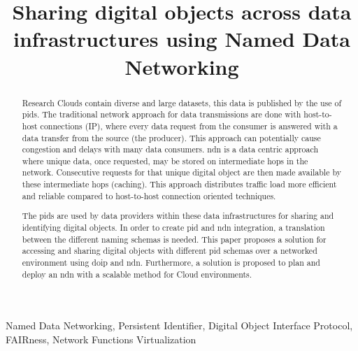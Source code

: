 \documentclass[conference]{IEEEtran}
\begin{document}
\title{Sharing digital objects across data infrastructures using Named Data Networking
}

\author{

}

\maketitle

\begin{abstract}
Research Clouds contain diverse and large datasets, this data is published by the use of \glspl{pid}. The traditional network approach for data transmissions are done with host-to-host connections (IP), where every data request from the consumer is answered with a data transfer from the source (the producer). This approach can potentially cause congestion and delays with many data consumers. \gls{ndn} is a data centric approach where unique data, once requested, may be stored on intermediate hops in the network. Consecutive requests for that unique digital object are then made available by these intermediate hops (caching). This approach distributes traffic load more efficient and reliable compared to host-to-host connection oriented techniques.

The \glspl{pid} are used by data providers within these data infrastructures for sharing and identifying digital objects. In order to create \gls{pid} and \gls{ndn} integration, a translation between the different naming schemas is needed. This paper proposes a solution for accessing and sharing digital objects with different \gls{pid} schemas over a networked environment using \gls{doip} and \gls{ndn}. Furthermore, a solution is proposed to plan and deploy an \gls{ndn} with a scalable method for Cloud environments.



\end{abstract}

\begin{IEEEkeywords}
Named Data Networking, Persistent Identifier, Digital Object Interface Protocol, FAIRness, Network Functions Virtualization
\end{IEEEkeywords}
\end{document}
